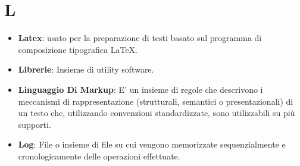 \section{L}
\begin{itemize}
	\item
	\textbf{Latex}:  usato per la preparazione di testi basato sul programma di composizione tipografica \LaTeX.
	\item
	\textbf{Librerie}: Insieme di utility software.
	\item
	\textbf{Linguaggio Di Markup}: E' un insieme di regole che descrivono i meccanismi di rappresentazione (strutturali, semantici o presentazionali) di un testo che, utilizzando convenzioni standardizzate, sono utilizzabili su più supporti.
	\item
	\textbf{Log}: File o insieme di file su cui vengono memorizzate sequenzialmente e cronologicamente delle operazioni effettuate.
\end{itemize}
\newpage